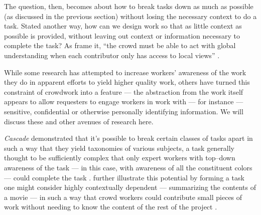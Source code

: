 \documentclass[trackingWork]{subfiles}
\begin{document}
The question, then, becomes about how to break tasks down as much as possible
(as discussed in the previous section)
without losing the necessary context to do a task.
Stated another way, how can we design work so that as little context as possible is provided,
without leaving out context or information necessary to complete the task?
As \citeauthor{verroios2014context} frame it,
``the crowd must be able to act with
global understanding when each contributor only has access to local views''
\cite{verroios2014context}.

While some research has attempted to increase workers' awareness of the work they do in
apparent efforts to yield higher quality work,
others have turned this constraint of crowdwork into a feature ---
the abstraction from the work itself
appears to allow requesters to engage workers in work with ---
for instance ---
sensitive, confidential or otherwise personally identifying information.
We will discuss these and other avenues of research here.

\textit{Cascade} demonstrated that it's possible to
break certain classes of tasks apart
in such a way that they yield taxonomies of various subjects,
a task generally thought to be sufficiently complex that only expert workers
with top--down awareness of the task
--- in this case, with awareness of all the constituent colors ---
could complete the task
\cite{chilton2013cascade}.
\citeauthor{verroios2014context} further illustrate this potential by
forming a task one might consider highly contextually dependent
--- summarizing the contents of a movie ---
in such a way that crowd workers could contribute small pieces of work without
needing to know the content of the rest of the project
\cite{verroios2014context}.


\end{document}
